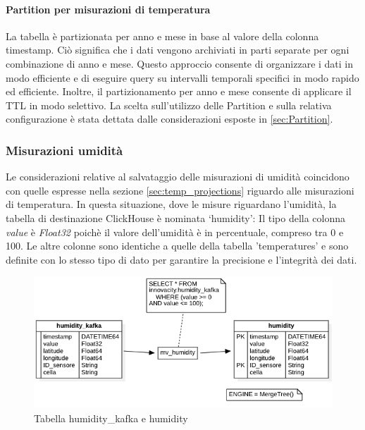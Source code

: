 \paragraph*{Partition per misurazioni di temperatura}\label{sec:temp_part}
La tabella è partizionata per anno e mese in base al valore della colonna timestamp. Ciò significa che i dati vengono archiviati in parti separate per ogni combinazione di anno e mese. Questo approccio consente di organizzare i dati in modo efficiente e di eseguire query su intervalli temporali specifici in modo rapido ed efficiente. Inoltre, il partizionamento per anno e mese consente di applicare il TTL in modo selettivo.
La scelta sull'utilizzo delle Partition e sulla relativa configurazione è stata dettata dalle considerazioni esposte in \ref{sec:Partition}.


\subsubsection{Misurazioni umidità}
Le considerazioni relative al salvataggio delle misurazioni di umidità coincidono con quelle espresse nella sezione \ref{sec:temp_projections} riguardo alle misurazioni di temperatura.
In questa situazione, dove le misure riguardano l’umidità, la tabella di destinazione ClickHouse è nominata ‘humidity’:
Il tipo della colonna \textit{value} è \textit{Float32} poichè il valore dell'umidità è in percentuale, compreso tra 0 e 100. Le altre colonne sono identiche a quelle della tabella 'temperatures' e sono definite con lo stesso tipo di dato per garantire la precisione e l'integrità dei dati.
\begin{figure}[H]
    \centering
    \includegraphics[width=1\textwidth]{../Images/SpecificaTecnica/humidity.png}
    \caption{Tabella humidity\_kafka e humidity}
    \label{fig:humidity_tables}
  \end{figure}

